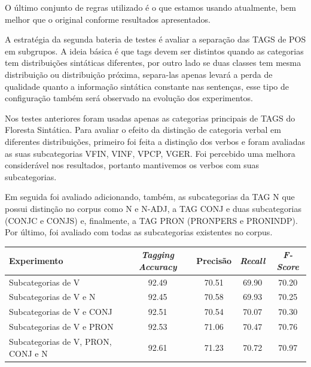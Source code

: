 O último conjunto de regras utilizado é o que estamos usando atualmente, bem melhor que o original conforme resultados apresentados. 

A estratégia da segunda bateria de testes é avaliar a separação das TAGS de POS em subgrupos. A ideia básica é que tags devem ser distintos quando as categorias tem distribuições sintáticas diferentes, por outro lado se duas classes tem mesma distribuição ou distribuição próxima, separa-las apenas levará a perda de qualidade quanto a informação sintática constante nas sentenças, esse tipo de configuração também será observado na evolução dos experimentos.

Nos testes anteriores foram usadas apenas as categorias principais de TAGS do Floresta Sintática. Para avaliar o efeito da distinção de categoria verbal em diferentes distribuições, primeiro foi feita a distinção dos verbos e foram avaliadas as suas subcategorias VFIN, VINF, VPCP, VGER. Foi percebido uma melhora considerável nos resultados, portanto mantivemos os verbos com suas subcategorias. 

Em seguida foi avaliado adicionando, também, as subcategorias da TAG N que possui distinção no corpus como N e N-ADJ, a TAG CONJ e duas subcategorias (CONJC e CONJS) e, finalmente, a TAG PRON (PRONPERS e PRONINDP). Por último, foi avaliado com todas as subcategorias existentes no corpus.


\begin{center}
   \footnotesize
	\begin{tabular}{|l|c|c|c|c|}
		\hline
		\textbf{Experimento} &  \textbf{\emph{Tagging Accuracy}} & \textbf{Precisão} & \textbf{\emph{Recall}} & \textbf{\emph{F-Score}} \\
		\hline
		Subcategorias de V & 92.49 & 70.51 & 69.90 & 70.20\\
		\hline		
		Subcategorias de V e N & 92.45 & 70.58 & 69.93 & 70.25\\
		\hline		
		Subcategorias de V e CONJ & 92.51 & 70.54 & 70.07 & 70.30\\
		\hline		
		Subcategorias de V e PRON & 92.53 & 71.06 & 70.47 & 70.76\\
		\hline
		Subcategorias de V, PRON, CONJ e N & 92.61 & 71.23 & 70.72 & 70.97\\
		\hline
	\end{tabular}
	\label{tab:segundo_experimento}
\end{center}

